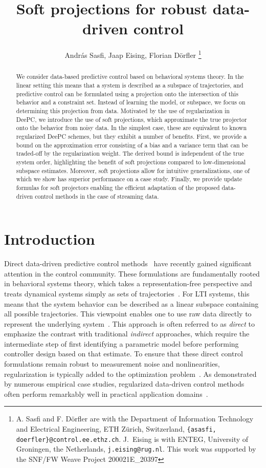 \documentclass[letterpaper, 10 pt, conference]{ieeeconf}
\title{\LARGE \bf
Soft projections for robust data-driven control
}
\author{Andr\'as Sasfi, Jaap Eising, Florian D\"orfler%
\thanks{A. Sasfi and F. D\"orfler are with the Department of Information Technology and Electrical Engineering, ETH Z\"urich, Switzerland, {\tt\footnotesize \{asasfi, doerfler\}@control.ee.ethz.ch}. J.~Eising is with ENTEG, University of Groningen, the Netherlands, {\tt\footnotesize j.eising@rug.nl}. This work was supported by the SNF/FW Weave Project 200021E\_20397}}
\begin{document}
\maketitle
\thispagestyle{empty}
\pagestyle{empty}

\begin{abstract}
We consider data-based predictive control based on behavioral systems theory.
In the linear setting this means that a system is described as a subspace of trajectories, and predictive control can be formulated using a projection onto the intersection of this behavior and a constraint set.
Instead of learning the model, or subspace, we focus on determining this projection from data.
Motivated by the use of regularization in \gls{DeePC}, we introduce the use of soft projections, which approximate the true projector onto the behavior from noisy data.
In the simplest case, these are equivalent to known regularized \gls{DeePC} schemes, but they exhibit a number of benefits.
First, we provide a bound on the approximation error consisting of a bias and a variance term that can be traded-off by the regularization weight.
The derived bound is independent of the true system order, highlighting the benefit of soft projections compared to low-dimensional subspace estimates.
Moreover, soft projections allow for intuitive generalizations, one of which we show has superior performance on a case study.
Finally, we provide update formulas for soft projectors enabling the efficient adaptation of the proposed data-driven control methods in the case of streaming data.
\end{abstract}

\section{Introduction}
Direct data-driven predictive control methods~\cite{coulson2019data,coulson2021distributionally,berberich2020data,breschi2023data,verhoek2021data,vanwaarde2020informativity,depersis2019formulas} have recently gained significant attention in the control community. 
These formulations are fundamentally rooted in behavioral systems theory, which takes a representation-free perspective and treats dynamical systems simply as sets of trajectories~\cite{willems1997introduction}. 
For \gls{LTI} systems, this means that the system behavior can be described as a linear subspace containing all possible trajectories.
This viewpoint enables one to use raw data directly to represent the underlying system~\cite{willems2005note}.
This approach is often referred to as \textit{direct} to emphasize the contrast with traditional \textit{indirect} approaches, which require the intermediate step of first identifying a parametric model before performing controller design based on that estimate.
To ensure that these direct control formulations remain robust to measurement noise and nonlinearities, regularization is typically added to the optimization problem~\cite{dorfler2022bridging,markovsky2022data}.
As demonstrated by numerous empirical case studies, regularized data-driven control methods often perform remarkably well in practical application domains~\cite{dorfler2022bridging,markovsky2021behavioral}.
\end{document}
